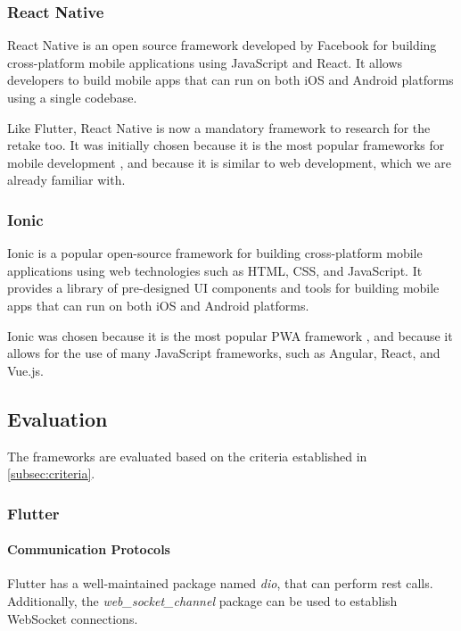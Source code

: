 \subsubsection{React Native}\label{subsubsec:frameworks-react-native}
React Native is an open source framework developed by Facebook for building cross-platform mobile applications using JavaScript and React.
It allows developers to build mobile apps that can run on both iOS and Android platforms using a single codebase. \cite{bib:most-popular-mobile-frameworks-2024}

Like Flutter, React Native is now a mandatory framework to research for the retake too.
It was initially chosen because it is the most popular frameworks for mobile development \cite{bib:most-popular-mobile-frameworks-2024}, and because it is similar to web development, which we are already familiar with.

\subsubsection{Ionic}\label{subsubsec:frameworks-ionic}
Ionic is a popular open-source framework for building cross-platform mobile applications using web technologies such as HTML, CSS, and JavaScript.
It provides a library of pre-designed UI components and tools for building mobile apps that can run on both iOS and Android platforms. \cite{bib:most-popular-mobile-frameworks-2024}

Ionic was chosen because it is the most popular PWA framework \cite{bib:most-popular-mobile-frameworks-2024}, and because it allows for the use of many JavaScript frameworks, such as Angular, React, and Vue.js. \cite{bib:ionic-documentation}

\subsection{Evaluation}\label{subsec:evaluation}
The frameworks are evaluated based on the criteria established in \cref{subsec:criteria}.

\subsubsection{Flutter}\label{subsubsec:evaluation-flutter}

\paragraph{Communication Protocols}
Flutter has a well-maintained package named \emph{dio}, that can perform rest calls. \cite{bib:dio-package}
Additionally, the \emph{web\_socket\_channel} package can be used to establish WebSocket connections. \cite{bib:web-socket-channel-package}


